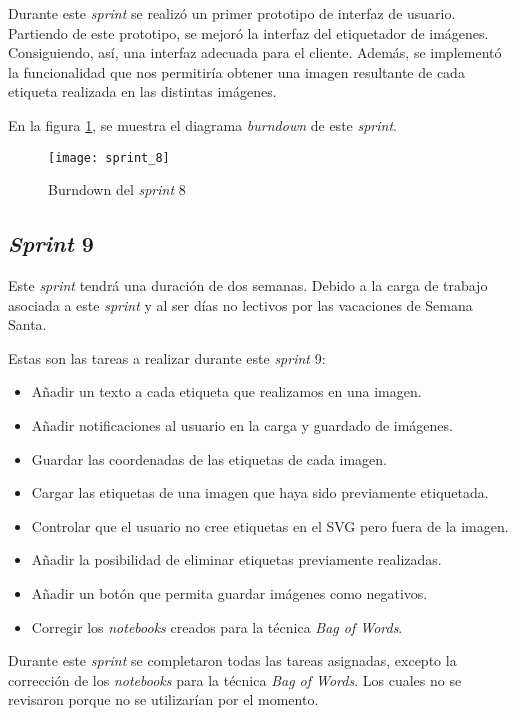 Durante este \textit{sprint} se realizó un primer prototipo de interfaz de  usuario. Partiendo de este prototipo, se mejoró la interfaz del etiquetador de imágenes. Consiguiendo, así, una interfaz adecuada para el cliente. Además, se implementó la funcionalidad que nos permitiría obtener una imagen resultante de cada etiqueta realizada en las distintas imágenes.

En la figura \ref{fig:A.1.9}, se muestra el diagrama \textit{burndown} de este \textit{sprint}.

\begin{figure}
\centering
\texttt{[image: sprint\_8]}
\caption{Burndown del \textit{sprint} 8}
\label{fig:A.1.9}
\end{figure}

\subsection{\textit{Sprint} 9}

Este \textit{sprint} tendrá una duración de dos semanas. Debido  a la carga de trabajo asociada a este \textit{sprint} y al ser días no lectivos por las vacaciones de Semana Santa. 

Estas son las tareas a realizar durante este \textit{sprint} 9:

\begin{itemize}
	\item Añadir un texto a cada etiqueta que realizamos en una imagen.
	\item Añadir notificaciones al usuario en la carga y guardado de imágenes.
	\item Guardar las coordenadas de las etiquetas de cada imagen.
	\item Cargar las etiquetas de una imagen que haya sido previamente etiquetada.
	\item Controlar que el usuario no cree etiquetas en el SVG pero fuera de la imagen.
	\item Añadir la posibilidad de eliminar etiquetas previamente realizadas.
	\item Añadir un botón que permita guardar imágenes como negativos.
	\item Corregir los \textit{notebooks} creados para la técnica \textit{Bag of Words}.
\end{itemize}

Durante este \textit{sprint} se completaron todas las tareas asignadas, excepto la corrección de los \textit{notebooks} para la técnica \textit{Bag of Words}. Los cuales no se revisaron porque no se utilizarían por el momento.

